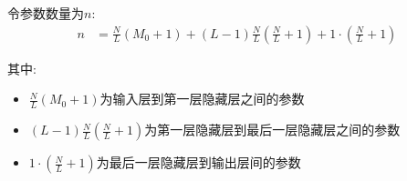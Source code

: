 \documentclass[]{subfiles}
\begin{document}
令参数数量为$n$:
\begin{align*}
n
& = \frac{N}{L}(M_0 + 1)
    + (L-1)\frac{N}{L}(\frac{N}{L} + 1)
    + 1 \cdot (\frac{N}{L} + 1)
\end{align*}

其中:
\begin{itemize}
\item $\frac{N}{L}(M_0 + 1)$为输入层到第一层隐藏层之间的参数
\item $(L-1)\frac{N}{L}(\frac{N}{L} + 1)$为第一层隐藏层到最后一层隐藏层之间的参数
\item $1 \cdot (\frac{N}{L} + 1)$为最后一层隐藏层到输出层间的参数
\end{itemize}
\end{document}
